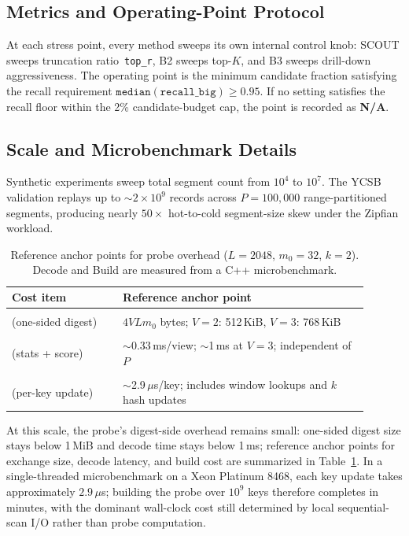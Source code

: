 \subsection{Metrics and Operating-Point Protocol}
\label{sec:appendix-metrics}

At each stress point, every method sweeps its own internal
control knob:
SCOUT sweeps truncation ratio~\texttt{top\_r},
B2 sweeps top-$K$,
and B3 sweeps drill-down aggressiveness.
The operating point is the minimum candidate fraction
satisfying the recall requirement
$\mathtt{median(recall\_big)}\ge 0.95$.
If no setting satisfies the recall floor within the 2\%
candidate-budget cap, the point is recorded as
\textbf{N/A}.

\subsection{Scale and Microbenchmark Details}
\label{sec:appendix-scale}

Synthetic experiments sweep total segment count from
$10^4$ to $10^7$.
The YCSB validation replays up to ${\sim}2{\times}10^9$
records across $P{=}100{,}000$ range-partitioned segments,
producing nearly $50\times$ hot-to-cold segment-size skew
under the Zipfian workload.

\begin{table}[!thbp]
\centering
\small
\begin{tabular}{p{0.28\linewidth}p{0.62\linewidth}}
\toprule
Cost item & Reference anchor point \\
\midrule
\makecell[tl]{\textbf{Exchange} \\ (one-sided digest)}
  & $4VLm_0$ bytes; $V{=}2$: 512\,KiB, $V{=}3$: 768\,KiB \\
\makecell[tl]{\textbf{Decode} \\ (stats + score)}
  & $\sim$0.33\,ms/view; $\sim$1\,ms at $V{=}3$; independent of $P$ \\
\makecell[tl]{\textbf{Build} \\ (per-key update)}
  & $\sim$2.9\,$\mu$s/key; includes window lookups and $k$ hash updates \\
\bottomrule
\end{tabular}
\caption{Reference anchor points for probe overhead ($L{=}2048$, $m_0{=}32$, $k{=}2$).
Decode and Build are measured from a C++ microbenchmark.}
\label{tab:cost-anchor}
\end{table}

At this scale, the probe's digest-side overhead remains small:
one-sided digest size stays below 1\,MiB and decode time stays
below 1\,ms; reference anchor points for exchange size, decode
latency, and build cost are summarized in
Table~\ref{tab:cost-anchor}.
In a single-threaded microbenchmark on a Xeon Platinum 8468,
each key update takes approximately $2.9\,\mu$s; building the
probe over $10^9$ keys therefore completes in minutes, with
the dominant wall-clock cost still determined by local
sequential-scan I/O rather than probe computation.
